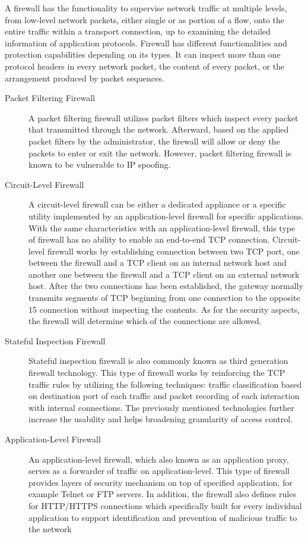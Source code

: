 \documentclass[../index.tex]{subfiles}
\begin{document}
A firewall has the functionality to supervise network traffic at multiple levels, from low-level
network packets, either single or as portion of a flow, onto the entire traffic within a transport
connection, up to examining the detailed information of application protocols. Firewall has
different functionalities and protection capabilities depending on its types. It can inspect more
than one protocol headers in every network packet, the content of every packet, or the arrangement
produced by packet sequences.

\begin{description}

	\item[Packet Filtering Firewall] A packet filtering firewall utilizes packet filters which inspect
		every packet that transmitted through the network. Afterward, based on the applied packet
		filters by the administrator, the firewall will allow or deny the packets to enter or exit the
		network. However, packet filtering firewall is known to be vulnerable to IP spoofing.

	\item[Circuit-Level Firewall] A circuit-level firewall can be either a dedicated appliance or a
		specific utility implemented by an application-level firewall for specific applications. With
		the same characteristics with an application-level firewall, this type of firewall has no
		ability to enable an end-to-end TCP connection. Circuit-level firewall works by establishing
		connection between two TCP port, one between the firewall and a TCP client on an internal
		network host and another one between the firewall and a TCP client on an external network host.
		After the two connections has been established, the gateway normally transmits segments of TCP
		beginning from one connection to the opposite 15 connection without inspecting the contents. As
		for the security aspects, the firewall will determine which of the connections are allowed.

	\item[Stateful Inspection Firewall] Stateful inspection firewall is also commonly known as third
		generation firewall technology. This type of firewall works by reinforcing the TCP traffic rules
		by utilizing the following techniques: traffic classification based on destination port of each
		traffic and packet recording of each interaction with internal connections. The previously
		mentioned technologies further increase the usability and helps broadening granularity of access
		control.

	\item[Application-Level Firewall] An application-level firewall, which also known as an
		application proxy, serves as a forwarder of traffic on application-level. This type of firewall
		provides layers of security mechanism on top of specified application, for example Telnet or FTP
		servers. In addition, the firewall also defines rules for HTTP/HTTPS connections which
		specifically built for every individual application to support identification and prevention of
		malicious traffic to the network

\end{description}
\end{document}
